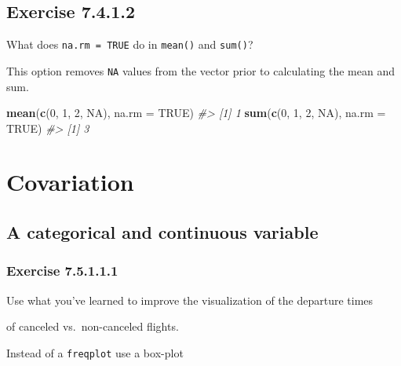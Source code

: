 \documentclass[]{book}
\newenvironment{Shaded}{\begin{snugshade}}{\end{snugshade}}
\newcommand{\CommentTok}[1]{\textcolor[rgb]{0.56,0.35,0.01}{\textit{#1}}}
\newcommand{\DataTypeTok}[1]{\textcolor[rgb]{0.13,0.29,0.53}{#1}}
\newcommand{\DecValTok}[1]{\textcolor[rgb]{0.00,0.00,0.81}{#1}}
\newcommand{\KeywordTok}[1]{\textcolor[rgb]{0.13,0.29,0.53}{\textbf{#1}}}
\newcommand{\NormalTok}[1]{#1}
\newcommand{\OtherTok}[1]{\textcolor[rgb]{0.56,0.35,0.01}{#1}}
\theoremstyle{plain}
\theoremstyle{remark}
\begin{document}
\hypertarget{exercise-7.4.1.2}{%
\subsection*{\texorpdfstring{Exercise
{7.4.1.2}}{Exercise 7.4.1.2}}\label{exercise-7.4.1.2}}

What does \texttt{na.rm\ =\ TRUE} do in \texttt{mean()} and
\texttt{sum()}?

This option removes \texttt{NA} values from the vector prior to
calculating the mean and sum.

\begin{Shaded}
\begin{Highlighting}[]
\KeywordTok{mean}\NormalTok{(}\KeywordTok{c}\NormalTok{(}\DecValTok{0}\NormalTok{, }\DecValTok{1}\NormalTok{, }\DecValTok{2}\NormalTok{, }\OtherTok{NA}\NormalTok{), }\DataTypeTok{na.rm =} \OtherTok{TRUE}\NormalTok{)}
\CommentTok{#> [1] 1}
\KeywordTok{sum}\NormalTok{(}\KeywordTok{c}\NormalTok{(}\DecValTok{0}\NormalTok{, }\DecValTok{1}\NormalTok{, }\DecValTok{2}\NormalTok{, }\OtherTok{NA}\NormalTok{), }\DataTypeTok{na.rm =} \OtherTok{TRUE}\NormalTok{)}
\CommentTok{#> [1] 3}
\end{Highlighting}
\end{Shaded}

\hypertarget{covariation}{%
\section{Covariation}\label{covariation}}

\hypertarget{a-categorical-and-continuous-variable}{%
\subsection{A categorical and continuous
variable}\label{a-categorical-and-continuous-variable}}

\hypertarget{exercise-7.5.1.1.1}{%
\subsubsection*{\texorpdfstring{Exercise
{7.5.1.1.1}}{Exercise 7.5.1.1.1}}\label{exercise-7.5.1.1.1}}

Use what you've learned to improve the visualization of the departure
times

of canceled vs.~non-canceled flights.

Instead of a \texttt{freqplot} use a box-plot
\end{document}
